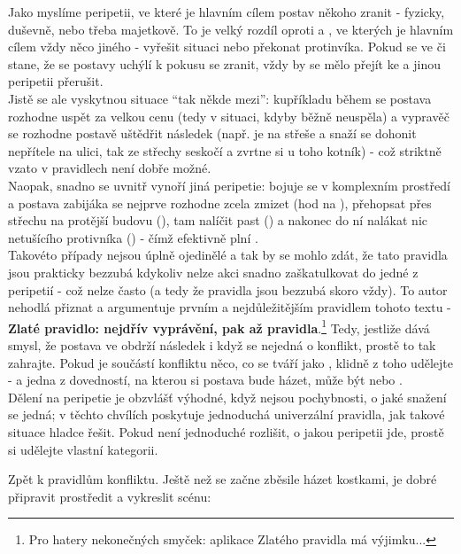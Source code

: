 Jako  myslíme peripetii, ve které je hlavním cílem postav někoho zranit - fyzicky, duševně, nebo třeba majetkově. To je velký rozdíl oproti  a , ve kterých je hlavním cílem vždy něco jiného - vyřešit situaci nebo překonat protinvíka. Pokud se ve  či  stane, že se postavy uchýlí k pokusu se zranit, vždy by se mělo přejít ke  a jinou peripetii přerušit.\\
Jistě se ale vyskytnou situace ``tak někde mezi'': kupříkladu během  se postava rozhodne uspět za velkou cenu (tedy v situaci, kdyby běžně neuspěla) a vypravěč se rozhodne postavě uštědřit následek (např. je na střeše a snaží se dohonit nepřítele na ulici, tak ze střechy seskočí a zvrtne si u toho kotník) - což striktně vzato v pravidlech  není dobře možné.\\
Naopak, snadno se uvnitř  vynoří jiná peripetie: bojuje se v komplexním prostředí a postava zabijáka se nejprve rozhodne zcela zmizet (hod na ), přehopsat přes střechu na protější budovu (), tam nalíčit past () a nakonec do ní nalákat nic netušícího protivníka () - čímž efektivně plní .\\
Takovéto případy nejsou úplně ojedinělé a tak by se mohlo zdát, že tato pravidla jsou prakticky bezzubá kdykoliv nelze akci snadno zaškatulkovat do jedné z peripetií - což nelze často (a tedy že pravidla jsou bezzubá skoro vždy). To autor nehodlá přiznat a argumentuje prvním a nejdůležitějším pravidlem tohoto textu - \textbf{Zlaté pravidlo: nejdřív vyprávění, pak až pravidla}.\footnote{Pro hatery nekonečných smyček: aplikace Zlatého pravidla má výjimku...} Tedy, jestliže dává smysl, že postava ve  obdrží následek i když se nejedná o konflikt, prostě to tak zahrajte. Pokud je součástí konfliktu něco, co se tváří jako , klidně z toho  udělejte - a jedna z dovedností, na kterou si postava bude házet, může být  nebo .\\

Dělení na peripetie je obzvlášť výhodné, když nejsou pochybnosti, o jaké snažení se jedná; v těchto chvílích poskytuje jednoduchá univerzální pravidla, jak takové situace hladce řešit. Pokud není jednoduché rozlišit, o jakou peripetii jde, prostě si udělejte vlastní kategorii.



Zpět k pravidlům konfliktu. Ještě než se začne zběsile házet kostkami, je dobré připravit prostředit a vykreslit scénu:

